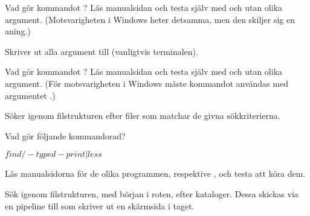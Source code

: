 \documentclass[a4paper]{miunasgn}
\begin{document}
\begin{questions}
  \question\label{q:echo}
  Vad gör kommandot ?
  Läs manualsidan och testa själv med och utan olika argument.
  (Motsvarigheten i Windows heter detsamma, men den skiljer sig en aning.)
  \begin{solution}
    Skriver ut alla argument till  (vanligtvis terminalen).
  \end{solution}

  \question\label{q:find}
  Vad gör kommandot ?
  Läs manualsidan och testa själv med och utan olika argument.
  (För motsvarigheten i Windows måste kommandot  användas med 
  argumentet .)
  \begin{solution}
    Söker igenom filstrukturen efter filer som matchar de givna sökkriterierna.
  \end{solution}

  \question\label{q:findless}
  Vad gör följande kommandorad?
  \begin{terminal}
$ find / -type d -print | less
$
  \end{terminal}
  Läs manualsidorna för de olika programmen,  respektive 
  , och testa att köra dem.
  \begin{solution}
    Sök igenom filstrukturen, med början i roten, efter kataloger.
    Dessa skickas via en pipeline till  som skriver ut en 
    skärmsida i taget.
  \end{solution}

  \question\label{q:fs}


\end{questions}
\end{document}
